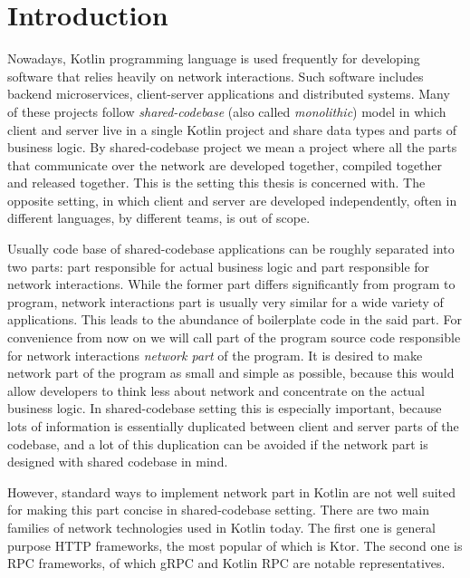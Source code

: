 \documentclass[a4paper,11pt,oneside]{article}
\newcommand{\term}[1]{\textit{#1}}
\begin{document}
\clearpage
{}

\section{Introduction}

Nowadays, Kotlin programming language is used frequently for developing software that relies
heavily on network interactions. Such software includes backend microservices, client-server
applications and distributed systems. Many of these projects follow \term{shared-codebase} (also
called \term{monolithic}) model in which client and server live in a single Kotlin project and
share data types and parts of business logic. By shared-codebase project we mean a project where
all the parts that communicate over the network are developed together, compiled together and
released together. This is the setting this thesis is concerned with. The opposite setting, in
which client and server are developed independently, often in different languages, by different
teams, is out of scope.

Usually code base of shared-codebase applications can be roughly separated into two parts:
part responsible for actual business logic and part responsible for network interactions. While
the former part differs significantly from program to program, network interactions part is usually
very similar for a wide variety of applications. This leads to the abundance of boilerplate code
in the said part. For convenience from now on we will call part of the program source code
responsible for network interactions \term{network part} of the program. It is desired to make
network part of the program as small and simple as possible, because this would allow developers
to think less about network and concentrate on the actual business logic. In shared-codebase
setting this is especially important, because lots of information is essentially duplicated between
client and server parts of the codebase, and a lot of this duplication can be avoided if the
network part is designed with shared codebase in mind.

However, standard ways to implement network part in Kotlin are not well suited for making this part
concise in shared-codebase setting. There are two main families of network technologies used in
Kotlin today. The first one is general purpose HTTP frameworks, the most popular of which is Ktor.
The second one is RPC frameworks, of which gRPC and Kotlin RPC are notable representatives.
\end{document}
